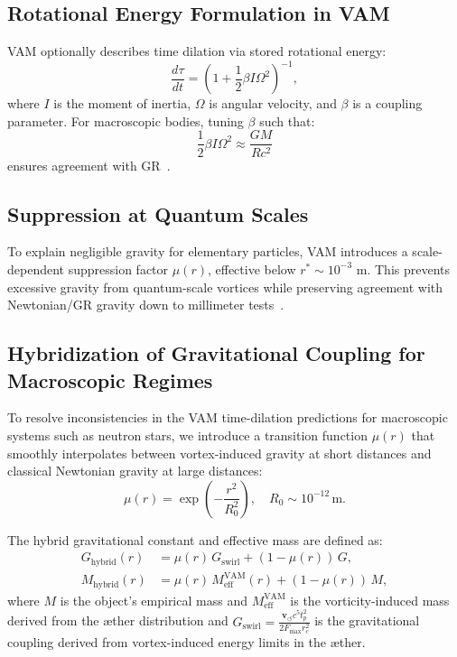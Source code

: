 \documentclass[a4paper, aps,preprint,superscriptaddress, 12pt]{revtex4}
\begin{document}
\subsection*{Rotational Energy Formulation in VAM}
VAM optionally describes time dilation via stored rotational energy:
\[
    \frac{d\tau}{dt} = \left(1 + \frac{1}{2}\beta I \Omega^2\right)^{-1},
\]
where $I$ is the moment of inertia, $\Omega$ is angular velocity, and $\beta$ is a coupling parameter. For macroscopic bodies, tuning $\beta$ such that:
\[
    \frac{1}{2} \beta I \Omega^2 \approx \frac{GM}{Rc^2}
\]
ensures agreement with GR~\cite{iskandarani2025VAM2}.

\subsection*{Suppression at Quantum Scales}
To explain negligible gravity for elementary particles, VAM introduces a scale-dependent suppression factor $\mu(r)$, effective below $r^* \sim 10^{-3}$ m. This prevents excessive gravity from quantum-scale vortices while preserving agreement with Newtonian/GR gravity down to millimeter tests~\cite{adelberger2003tests}.

\subsection{Hybridization of Gravitational Coupling for Macroscopic Regimes}

To resolve inconsistencies in the VAM time-dilation predictions for macroscopic systems such as neutron stars, we introduce a transition function \(\mu(r)\) that smoothly interpolates between vortex-induced gravity at short distances and classical Newtonian gravity at large distances:
\[
    \mu(r) = \exp\left(-\frac{r^2}{R_0^2}\right), \quad R_0 \sim 10^{-12} \, \mathrm{m}.
\]

The hybrid gravitational constant and effective mass are defined as:
\begin{align*}
    G_{\text{hybrid}}(r) &= \mu(r) \, G_{\text{swirl}} + (1 - \mu(r)) \, G, \\
    M_{\text{hybrid}}(r) &= \mu(r) \, M_{\text{eff}}^{\text{VAM}}(r) + (1 - \mu(r)) \, M,
\end{align*}
where \(M\) is the object's empirical mass and \(M_{\text{eff}}^{\text{VAM}}\) is the vorticity-induced mass derived from the æther distribution and $G_{\text{swirl}} = \frac{\mathbf{v}_{\scriptscriptstyle\boldsymbol{\circlearrowleft}} c^5 t_p^2}{2 F_{\max} r_c^2}$ is the gravitational coupling derived from vortex-induced energy limits in the æther.
\end{document}
